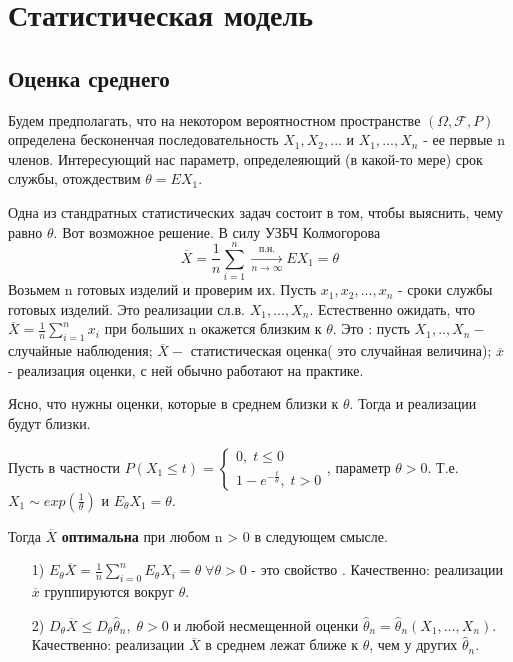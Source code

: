 \chapter{Статистическая модель}\label{cha:2}

\section{Оценка среднего}\label{cha:2/sec:1}
\begin{example}
	Будем предполагать, что на некотором вероятностном пространстве $ (\Omega, \mathcal{F}, P)$ определена бесконенчая последовательность $ X_1, X_2, ...$ и $ X_1, ... , X_n$ - ее первые n членов. Интересующий нас параметр, определеяющий (в какой-то мере) срок службы, отождествим $ \theta = EX_1$.

	Одна из стандратных статистических задач состоит в том, чтобы выяснить, чему равно $ \theta.$
	Вот возможное решение.
	В силу УЗБЧ Колмогорова
	$$\overline{X} = \frac{1}{n}\sum\limits_{i=1}^{n}\xrightarrow[n\to \infty]{\text{п.н.}}EX_1 = \theta$$
	Возьмем n готовых изделий и проверим их. Пусть $ x_1, x_2, ..., x_n$ - сроки службы готовых изделий. Это реализации сл.в. $ X_1, ..., X_n.$ Естественно ожидать, что $ \displaystyle \overline{X}  = \frac{1}{n}\sum\limits_{i=1}^{n}x_i$ при больших n окажется близким к $ \theta.$ Это : пусть $ X_1, .. ,X_n- $ случайные наблюдения; $ \overline{X}-  $ статистическая оценка( это случайная величина); $ \overline{x}$ - реализация оценки, с ней обычно работают на практике.

	Ясно, что нужны оценки, которые в среднем близки к $ \theta.$ Тогда и реализации будут близки.

	Пусть в частности 
	$\displaystyle P(X_1 \le t) = \begin{cases}
		0, \; t \leq 0\\
		1 - e^{-\frac{t}{\theta}}, \; t>0
	\end{cases}$, параметр $ \theta > 0$. Т.е. $ X_1 \sim exp(\frac{1}{\theta})$ и $ E_{\theta}X_1 = \theta.$

	Тогда $ \overline{X} $ \textbf{оптимальна} при любом n > 0 в следующем смысле.
	\begin{itemize}
			\item[1)] 
				$\displaystyle E_{\theta}\overline{X} = \frac{1}{n}\sum\limits_{i=0}^{n}E_{\theta}X_i = \theta \; \forall \theta > 0$ - это свойство . Качественно: реализации $ \overline{x}$ группируются вокруг $ \theta$.
			\item[2)] 
				$\displaystyle D_{\theta}\overline{X} \leq D_{\theta} \hat{\theta}_n, \; \theta > 0$ и любой несмещенной оценки $ \hat{\theta}_n = \hat{\theta}_n(X_1, \dots, X_n).$ Качественно: реализации $  \overline{X}$ в среднем лежат ближе к $ \theta$, чем у других $ \hat{\theta}_n$.
		\end{itemize}	
\end{example}


